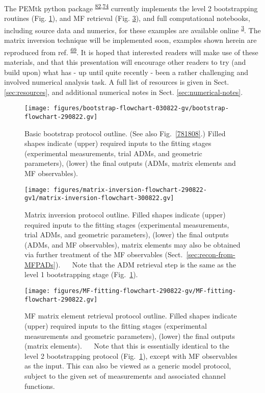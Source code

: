 \documentclass[10pt]{article}
\begin{document}
The PEMtk python package \textsuperscript{\hyperref[csl:82]{82},\hyperref[csl:74]{74}} currently implements the level 2 bootstrapping routines (Fig. \ref{807606}), and MF retrieval (Fig. \ref{671760}), and full computational notebooks, including source data and numerics, for these examples are available online \textsuperscript{\hyperref[csl:3]{3}}. The matrix inversion technique will be implemented soon, examples shown herein are reproduced from ref. \textsuperscript{\hyperref[csl:69]{69}}. It is hoped that interested readers will make use of these materials, and that this presentation will encourage other readers to try (and build upon) what has - up until quite recently - been a rather challenging and involved numerical analysis task. A full list of resources is given in Sect. \ref{sec:resources}, and additional numerical notes in Sect. \ref{sec:numerical-notes}.
\begin{figure}[H]
\begin{center}
\texttt{[image: figures/bootstrap-flowchart-030822-gv/bootstrap-flowchart-290822.gv]}
\caption{{Basic bootstrap protocol outline. (See also
Fig.~{\ref{781808}}.) Filled shapes indicate (upper)
required inputs to the fitting stages (experimental measurements, trial
ADMs, and geometric parameters), (lower) the final outputs (ADMs, matrix
elements and MF observables).
{\label{807606}}%
}}
\end{center}
\end{figure}
\begin{figure}[H]
\begin{center}
\texttt{[image: figures/matrix-inversion-flowchart-290822-gv1/matrix-inversion-flowchart-300822.gv]}
\caption{{Matrix inversion protocol outline. Filled shapes indicate (upper)
required inputs to the fitting stages (experimental measurements, trial
ADMs, and geometric parameters), (lower) the final outputs (ADMs, and MF
observables), matrix elements may also be obtained via further treatment
of the MF observables
(Sect.~{\ref{sec:recon-from-MFPADs}}).~ ~ Note that the
ADM retrieval step is the same as the level 1 bootstrapping stage
(Fig.~{\ref{807606}}).
{\label{731792}}%
}}
\end{center}
\end{figure}
\begin{figure}[H]
\begin{center}
\texttt{[image: figures/MF-fitting-flowchart-290822-gv/MF-fitting-flowchart-290822.gv]}
\caption{{MF matrix element retrieval protocol outline. Filled shapes indicate
(upper) required inputs to the fitting stages (experimental measurements
and geometric parameters), (lower) the final outputs (matrix elements).~
~ Note that this is essentially identical to the level 2 bootstrapping
protocol (Fig.~{\ref{807606}}), except with MF
observables as the input. This can also be viewed as a generic model
protocol, subject to the given set of measurements and associated
channel functions.
{\label{671760}}%
}}
\end{center}
\end{figure}
\end{document}
